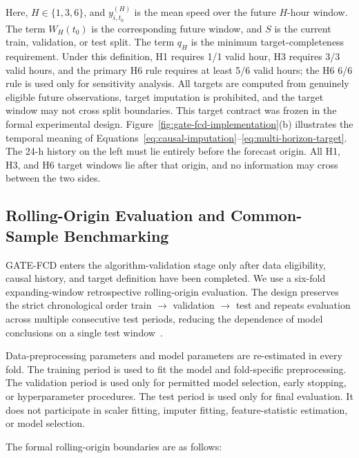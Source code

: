 \documentclass[pdflatex,sn-mathphys-num,iicol]{sn-jnl}
\begin{document}
Here, $H\in\{1,3,6\}$, and $y^{(H)}_{i,t_0}$ is the mean speed over the future $H$-hour window. The term $W_H(t_0)$ is the corresponding future window, and $S$ is the current train, validation, or test split. The term $q_H$ is the minimum target-completeness requirement. Under this definition, H1 requires 1/1 valid hour, H3 requires 3/3 valid hours, and the primary H6 rule requires at least 5/6 valid hours; the H6 6/6 rule is used only for sensitivity analysis. All targets are computed from genuinely eligible future observations, target imputation is prohibited, and the target window may not cross split boundaries. This target contract was frozen in the formal experimental design. Figure~\ref{fig:gate-fcd-implementation}(b) illustrates the temporal meaning of Equations~\ref{eq:causal-imputation}--\ref{eq:multi-horizon-target}. The 24-h history on the left must lie entirely before the forecast origin. All H1, H3, and H6 target windows lie after that origin, and no information may cross between the two sides.

\subsection{Rolling-Origin Evaluation and Common-Sample Benchmarking}
\label{subsec:rolling-origin}

GATE-FCD enters the algorithm-validation stage only after data eligibility, causal history, and target definition have been completed. We use a six-fold expanding-window retrospective rolling-origin evaluation. The design preserves the strict chronological order train $\rightarrow$ validation $\rightarrow$ test and repeats evaluation across multiple consecutive test periods, reducing the dependence of model conclusions on a single test window~\cite{Hewamalage2023ForecastEvaluation}.

Data-preprocessing parameters and model parameters are re-estimated in every fold. The training period is used to fit the model and fold-specific preprocessing. The validation period is used only for permitted model selection, early stopping, or hyperparameter procedures. The test period is used only for final evaluation. It does not participate in scaler fitting, imputer fitting, feature-statistic estimation, or model selection.

The formal rolling-origin boundaries are as follows:
\end{document}
